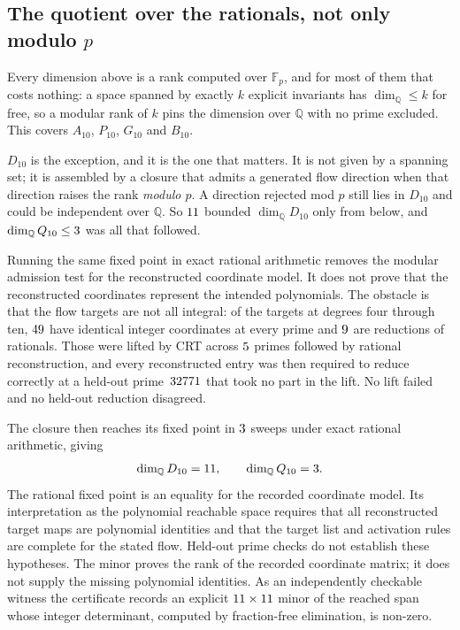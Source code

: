 \documentclass[11pt,a4paper]{article}
\begin{document}
\subsection{The quotient over the rationals, not only modulo $p$}
\label{sec:czero}

Every dimension above is a rank computed over $\mathbb{F}_p$, and for most of
them that costs nothing: a space spanned by exactly $k$ explicit invariants has
$\dim_{\mathbb{Q}} \le k$ for free, so a modular rank of $k$ pins the
dimension over $\mathbb{Q}$ with no prime excluded. This covers $A_{10}$,
$P_{10}$, $G_{10}$ and $B_{10}$.

$D_{10}$ is the exception, and it is the one that matters. It is not given by a
spanning set; it is assembled by a closure that admits a generated flow direction
when that direction raises the rank \emph{modulo $p$}. A direction rejected mod
$p$ still lies in $D_{10}$ and could be independent over $\mathbb{Q}$. So
$11$ bounded $\dim_{\mathbb{Q}} D_{10}$ only from below, and
$\dim_{\mathbb{Q}} Q_{10} \le 3$ was all that followed.

Running the same fixed point in exact rational arithmetic removes the modular
admission test for the reconstructed coordinate model. It does not prove that
the reconstructed coordinates represent the intended polynomials. The obstacle is that the flow targets are
not all integral: of the targets at degrees four through ten,
$49$ have identical integer coordinates at every prime and
$9$ are reductions of rationals. Those were lifted by CRT across
$5$ primes followed by rational reconstruction, and every
reconstructed entry was then required to reduce correctly at a held-out
prime~$32771$ that took no part in the lift. No lift failed and no
held-out reduction disagreed.

The closure then reaches its fixed point in $3$ sweeps under exact
rational arithmetic, giving
\begin{equation}
  \dim_{\mathbb{Q}} D_{10} = 11 ,
  \qquad
  \dim_{\mathbb{Q}} Q_{10} = 3 .
  \label{eq:czero}
\end{equation}
The rational fixed point is an equality for the recorded coordinate model.
Its interpretation as the polynomial reachable space requires that all
reconstructed target maps are polynomial identities and that the target list
and activation rules are complete for the stated flow. Held-out prime checks
do not establish these hypotheses. The minor proves the rank of the recorded
coordinate matrix; it does not supply the missing polynomial identities. As an independently
checkable witness the certificate records an explicit
$11 \times 11$ minor of the reached span whose integer
determinant, computed by fraction-free elimination, is non-zero.
\end{document}
